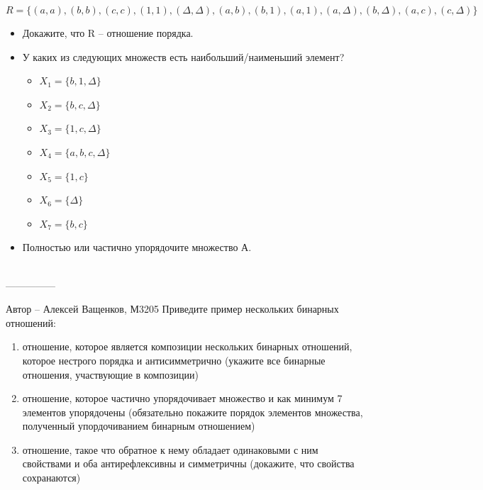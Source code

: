 \documentclass[10pt]{exam}
\begin{document}
\begin{questions}
\begin{equation*}
R = \{(a, a), (b, b), (c, c), (1, 1),
(\Delta, \Delta), (a, b), (b, 1), (a, 1),
(a, \Delta), (b, \Delta), (a, c), (c, \Delta)\}
\end{equation*}
\begin{itemize}
    \item Докажите, что R -- отношение порядка.
    \item У каких из следующих множеств есть наибольший/наименьший элемент?
    \begin{itemize}
        \item $X_1 = \{b, 1, \Delta\}$
        \item $X_2 = \{b, c, \Delta\}$
        \item $X_3 = \{1, c, \Delta\}$
        \item $X_4 = \{a, b, c, \Delta\}$
        \item $X_5 = \{1, c\}$
        \item $X_6 = \{ \Delta \}$
        \item $X_7 = \{b, c\}$
    \end{itemize}
    \item Полностью или частично упорядочите множество А.
\end{itemize}
\\
---------------

Автор -- Алексей Ващенков, М3205\question
Приведите  пример  нескольких бинарных отношений:
\begin{enumerate}
	\renewcommand{\labelenumi}{\alph{enumi})}
	\item отношение, которое является композиции нескольких бинарных отношений,  которое  нестрого порядка  и антисимметрично (укажите все бинарные отношения, участвующие в композиции)
	\item отношение, которое частично упорядочивает множество и как минимум 7 элементов упорядочены (обязательно покажите порядок элементов множества, полученный упордочиванием бинарным отношением)
	\item отношение, такое что обратное к нему  обладает одинаковыми с ним свойствами и оба антирефлексивны и симметричны (докажите, что свойства сохранаются)
\end{enumerate}


\end{questions}
\end{document}
